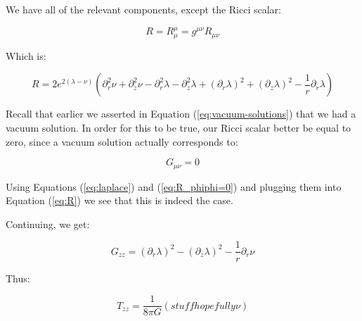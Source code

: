 \documentclass{article}
\begin{document}
We have all of the relevant components, except the Ricci scalar:

\begin{equation}
R=R_{\mu}^{\mu}=g^{\mu\nu}R_{\mu\nu}
\end{equation}

Which is:

\begin{equation}
R=2e^{2\left(\lambda-\nu\right)}\left(\partial^{2}_{r}\nu+\partial^{2}_{z}\nu-\partial^{2}_{r}\lambda-\partial^{2}_{z}\lambda+\left(\partial_{r}\lambda\right)^{2}+\left(\partial_{z}\lambda\right)^{2}-\frac{1}{r}\partial_{r}\lambda\right)\label{eq:R}
\end{equation}

Recall that earlier we asserted in Equation (\ref{eq:vacuum-solutions}) that we had a vacuum solution. In order for this to be true, our Ricci scalar better be equal to zero, since a vacuum solution actually corresponds to:

\begin{equation}
G_{\mu\nu}=0
\end{equation}

Using Equations (\ref{eq:laplace}) and (\ref{eq:R_phiphi=0}) and plugging them into Equation (\ref{eq:R}) we see that this is indeed the case.

Continuing, we get:

\begin{equation}
G_{zz}=\left(\partial_{r}\lambda\right)^{2}-\left(\partial_{z}\lambda\right)^{2}-\frac{1}{r}\partial_{r}\nu
\end{equation}

Thus:

\begin{equation}
T_{zz}=\frac{1}{8\pi G}(stuff hopefully \nu)
\end{equation}


\end{document}
